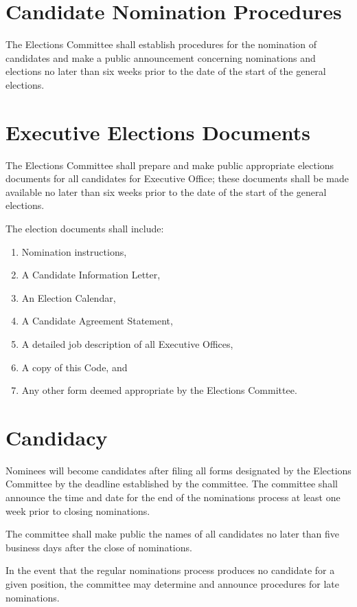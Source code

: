 \section{Candidate Nomination Procedures}
The Elections Committee shall establish procedures for the nomination of candidates and make a public announcement concerning nominations and elections no later than six weeks prior to the date of the start of the general elections.

\section{Executive Elections Documents}
\begin{bylaws-number}
  \item The Elections Committee shall prepare and make public appropriate elections documents for all candidates for Executive Office; these documents shall be made available no later than six weeks prior to the date of the start of the general elections.
  \item The election documents shall include:
  \begin{enumerate}
    \item Nomination instructions,
    \item A Candidate Information Letter,
    \item An Election Calendar,
    \item A Candidate Agreement Statement,
    \item A detailed job description of all Executive Offices,
    \item A copy of this Code, and
    \item Any other form deemed appropriate by the Elections Committee.
  \end{enumerate}
\end{bylaws-number}

\section{Candidacy}
\begin{bylaws-number}
  \item Nominees will become candidates after filing all forms designated by the Elections Committee by the deadline established by the committee. The committee shall announce the time and date for the end of the nominations process at least one week prior to closing nominations.
  \item The committee shall make public the names of all candidates no later than five business days after the close of nominations.
  \item In the event that the regular nominations process produces no candidate for a given position, the committee may determine and announce procedures for late nominations.
\end{bylaws-number}

